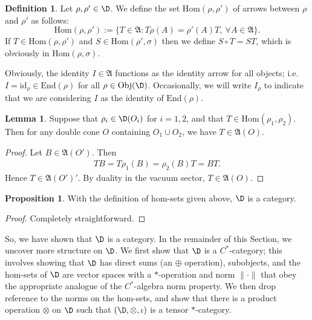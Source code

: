 \documentclass[12pt]{article}
\newcommand{\alg}[1]{\mathfrak{#1}}
\newcommand{\norm}[1]{\| #1\|}
\theoremstyle{definition}
\newtheorem{prop}[thm]{Proposition}
\newtheorem{lemma}[thm]{Lemma}
\theoremstyle{definition}
\newtheorem{defn}[thm]{Definition}
\theoremstyle{remark}
\newcommand{\Obj}{\mathrm{Obj}}
\newcommand{\Hom}{\mathrm{Hom}}
\newcommand{\End}{\mathrm{End}}
\def\id{\mathrm{id}}
\begin{document}
\begin{defn} Let $\rho ,\rho '\in \D$.  We define the set $\Hom (\rho ,\rho ')$ of
  arrows between $\rho$ and $\rho '$ as follows:
$$ \Hom (\rho ,\rho '):= \{ T\in \alg{A}:T\rho (A)=\rho '(A)T ,\: \forall A\in
\alg{A} \} .$$ If $T\in \Hom (\rho ,\rho ')$ and $S\in \Hom (\rho ',\sigma )$ then we
define $S\circ T=ST$, which is obviously in $\Hom (\rho ,\sigma )$.
\end{defn}

Obviously, the identity $I\in \alg{A}$ functions as the identity arrow for all
objects; i.e. $I=\id _{\rho}\in \End (\rho )$ for all $\rho \in \Obj (\D )$.
Occasionally, we will write $I_\rho$ to indicate that we are considering $I$ as the
identity of $\End (\rho )$.

  \begin{lemma} Suppose that $\rho _i\in \D (O_i)$ for $i=1,2$, and that $T\in \Hom
    (\rho _1,\rho _2)$.  Then for any double cone $O$ containing $O_1\cup O_2$, we
    have $T\in \alg{A}(O)$.  \label{twine} \end{lemma}

\begin{proof} Let $B\in \alg{A}(O')$.  Then 
  \begin{eqnarray*} TB = T\rho _1(B)=\rho _2(B)T =BT .\end{eqnarray*} Hence $T\in
  \alg{A}(O')'$.  By duality in the vacuum sector, $T\in \alg{A}(O)$.  \end{proof}

\begin{prop} With the definition of hom-sets given above, $\D$ is a category.
\end{prop}

\begin{proof} Completely straightforward.  \end{proof}

So, we have shown that $\D$ is a category.  In the remainder of this
Section, we uncover more structure on $\D$.  We first show that $\D$
is a $C^*$-category; this involves showing that $\D$ has direct sums
(an $\oplus$ operation), subobjects, and the hom-sets of $\D$ are
vector spaces with a $*$-operation and norm $\norm{\cdot}$ that obey
the appropriate analogue of the $C^*$-algebra norm property.  We then
drop reference to the norms on the hom-sets, and show that there is a
product operation $\otimes$ on $\D$ such that $(\D ,\otimes,\iota )$
is a tensor $*$-category.

\label{DHR-star}
\end{document}
